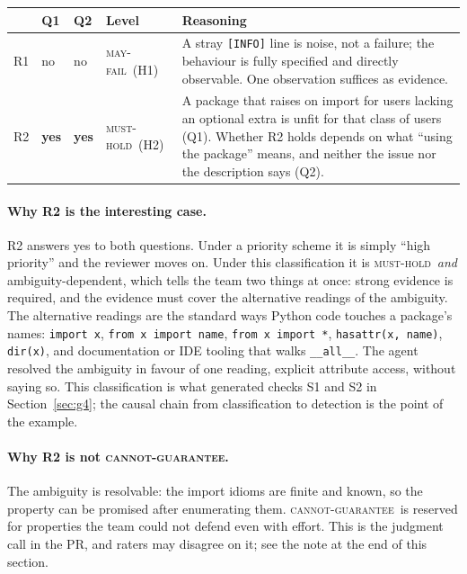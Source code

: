 \documentclass[11pt,a4paper]{article}
\newcommand{\code}[1]{\texttt{#1}}
\newcommand{\musthold}{\textsc{must-hold}}
\newcommand{\mayfail}{\textsc{may-fail}}
\newcommand{\cannot}{\textsc{cannot-guarantee}}
\begin{document}
\begin{center}\small
\begin{tabularx}{\textwidth}{l l l l X}
\toprule
 & Q1 & Q2 & Level & Reasoning \\
\midrule
R1 & no & no & \mayfail\ (H1) & A stray \code{[INFO]} line is noise, not a failure; the behaviour is fully specified and directly observable. One observation suffices as evidence. \\
R2 & \textbf{yes} & \textbf{yes} & \musthold\ (H2) & A package that raises on import for users lacking an optional extra is unfit for that class of users (Q1). Whether R2 holds depends on what ``using the package'' means, and neither the issue nor the description says (Q2). \\
\bottomrule
\end{tabularx}
\end{center}

\paragraph{Why R2 is the interesting case.} R2 answers yes to both questions. Under a priority scheme it is simply ``high priority'' and the reviewer moves on. Under this classification it is \musthold\ \emph{and} ambiguity-dependent, which tells the team two things at once: strong evidence is required, and the evidence must cover the alternative readings of the ambiguity. The alternative readings are the standard ways Python code touches a package's names: \code{import x}, \code{from x import name}, \code{from x import *}, \code{hasattr(x, name)}, \code{dir(x)}, and documentation or IDE tooling that walks \code{\_\_all\_\_}. The agent resolved the ambiguity in favour of one reading, explicit attribute access, without saying so. This classification is what generated checks S1 and S2 in Section~\ref{sec:g4}; the causal chain from classification to detection is the point of the example.

\paragraph{Why R2 is not \cannot.} The ambiguity is resolvable: the import idioms are finite and known, so the property can be promised after enumerating them. \cannot\ is reserved for properties the team could not defend even with effort. This is the judgment call in the PR, and raters may disagree on it; see the note at the end of this section.
\end{document}
